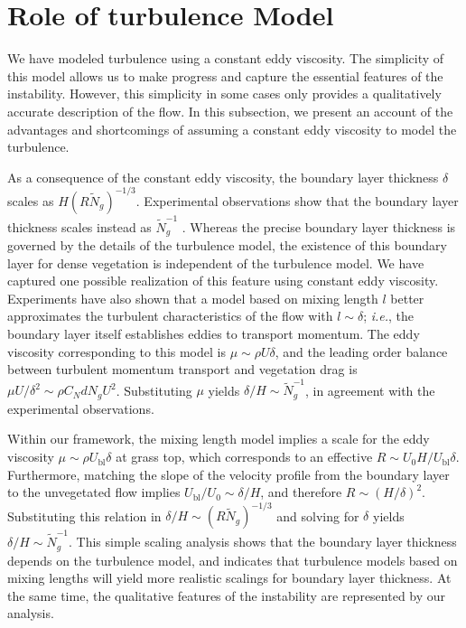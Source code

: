 \documentclass[12pt]{report}   %
\newcommand{\Rey}{{R}}
\newcommand{\Ndg}{\tilde{N}_g}
\newcommand{\ubl}{U_\text{bl}}
\newcommand{\ReyNdg}{{\Rey\Ndg}}
\begin{document}
\section{Role of turbulence Model}
We have modeled turbulence using a constant eddy viscosity. 
The simplicity of this model allows us to make progress and capture the essential features of the instability. 
However, this simplicity in some cases only provides a qualitatively accurate description of the flow. 
In this subsection, we present an account of the advantages and shortcomings of assuming a constant eddy viscosity to model the turbulence.

As a consequence of the constant eddy viscosity, the boundary layer thickness $\delta$ scales as $H(\ReyNdg)^{-1/3}$.
Experimental observations show that the boundary layer thickness scales instead as $\Ndg^{-1}$ \cite{Nepf07}.
Whereas the precise boundary layer thickness is governed by the details of the turbulence model, the existence of this boundary layer for dense vegetation is independent of the turbulence model. 
We have captured one possible realization of this feature using constant eddy viscosity.
Experiments have also shown that a model based on mixing length $l$ better approximates the turbulent characteristics of the flow with $l \sim \delta$; \textit{i.e.}, the boundary layer itself establishes eddies to transport momentum. 
The eddy viscosity corresponding to this model is $\mu \sim \rho U \delta$, and the leading order balance between turbulent momentum transport and vegetation drag is $\mu U/\delta^2 \sim \rho C_N d N_g U^2$.
Substituting $\mu$ yields $\delta/H \sim \Ndg^{-1}$, in agreement with the experimental observations.

Within our framework, the mixing length model implies a scale for the eddy viscosity $\mu \sim \rho \ubl \delta$ at grass top, which corresponds to an effective $\Rey \sim U_0H/\ubl \delta$.
Furthermore, matching the slope of the velocity profile from the boundary layer to the unvegetated flow implies $\ubl/U_0 \sim \delta/H$, and therefore $\Rey \sim (H/\delta)^2$.
Substituting this relation in $\delta/H \sim (\Rey \Ndg)^{-1/3}$ and solving for $\delta$ yields $\delta/H \sim \Ndg^{-1}$.
This simple scaling analysis shows that the boundary layer thickness depends on the turbulence model, and indicates that turbulence models based on mixing lengths will yield more realistic scalings for boundary layer thickness.
At the same time, the qualitative features of the instability are represented by our analysis.
\end{document}

